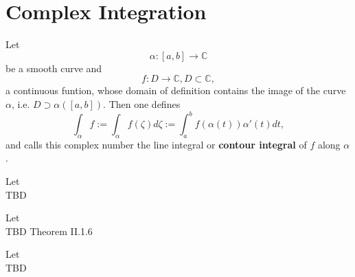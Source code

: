\section{Complex Integration}

\begin{definition}
    \label{sec:ContourIntegral}
    Let
    $$\alpha : [a, b] \rightarrow \mathbb{C}$$
    be a smooth curve and
    $$f: D \rightarrow \mathbb{C}, D \subset \mathbb{C},$$
    a continuous funtion, whose domain of definition contains the image of the curve $\alpha$,
    i.e. $D \supset \alpha([a,b]).$ Then one defines
    $$ \int_\alpha f:= \int_\alpha f(\zeta) d\zeta := \int_a^b f(\alpha(t))\alpha'(t)dt,$$
    and calls this complex number the line integral or \textbf{contour integral} of $f$ along $\alpha$.
\end{definition}

\begin{theorem}
    \label{sec:EstimationT}
    Let \\
    TBD
\end{theorem}

\begin{theorem}
    \label{sec:ClosedContourT}
    Let \\
    TBD Theorem II.1.6
\end{theorem}

\begin{theorem}
    \label{sec:CauchyIF}
    Let \\
    TBD
\end{theorem}